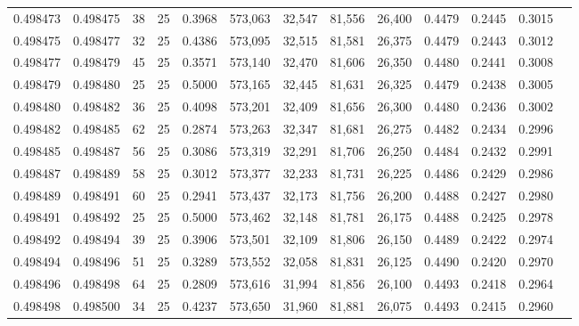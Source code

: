 \begin{tabular}{rrrrrrrrrrrrr}
0.498473 & 0.498475 &    38 &  25 &                                     0.3968 & 573,063 &  32,547 &  81,556 &  26,400 & 0.4479 & 0.2445 & 0.3015 \\
0.498475 & 0.498477 &    32 &  25 &                                     0.4386 & 573,095 &  32,515 &  81,581 &  26,375 & 0.4479 & 0.2443 & 0.3012 \\
0.498477 & 0.498479 &    45 &  25 &                                     0.3571 & 573,140 &  32,470 &  81,606 &  26,350 & 0.4480 & 0.2441 & 0.3008 \\
0.498479 & 0.498480 &    25 &  25 &                                     0.5000 & 573,165 &  32,445 &  81,631 &  26,325 & 0.4479 & 0.2438 & 0.3005 \\
0.498480 & 0.498482 &    36 &  25 &                                     0.4098 & 573,201 &  32,409 &  81,656 &  26,300 & 0.4480 & 0.2436 & 0.3002 \\
0.498482 & 0.498485 &    62 &  25 &                                     0.2874 & 573,263 &  32,347 &  81,681 &  26,275 & 0.4482 & 0.2434 & 0.2996 \\
0.498485 & 0.498487 &    56 &  25 &                                     0.3086 & 573,319 &  32,291 &  81,706 &  26,250 & 0.4484 & 0.2432 & 0.2991 \\
0.498487 & 0.498489 &    58 &  25 &                                     0.3012 & 573,377 &  32,233 &  81,731 &  26,225 & 0.4486 & 0.2429 & 0.2986 \\
0.498489 & 0.498491 &    60 &  25 &                                     0.2941 & 573,437 &  32,173 &  81,756 &  26,200 & 0.4488 & 0.2427 & 0.2980 \\
0.498491 & 0.498492 &    25 &  25 &                                     0.5000 & 573,462 &  32,148 &  81,781 &  26,175 & 0.4488 & 0.2425 & 0.2978 \\
0.498492 & 0.498494 &    39 &  25 &                                     0.3906 & 573,501 &  32,109 &  81,806 &  26,150 & 0.4489 & 0.2422 & 0.2974 \\
0.498494 & 0.498496 &    51 &  25 &                                     0.3289 & 573,552 &  32,058 &  81,831 &  26,125 & 0.4490 & 0.2420 & 0.2970 \\
0.498496 & 0.498498 &    64 &  25 &                                     0.2809 & 573,616 &  31,994 &  81,856 &  26,100 & 0.4493 & 0.2418 & 0.2964 \\
0.498498 & 0.498500 &    34 &  25 &                                     0.4237 & 573,650 &  31,960 &  81,881 &  26,075 & 0.4493 & 0.2415 & 0.2960 \\

\end{tabular}
